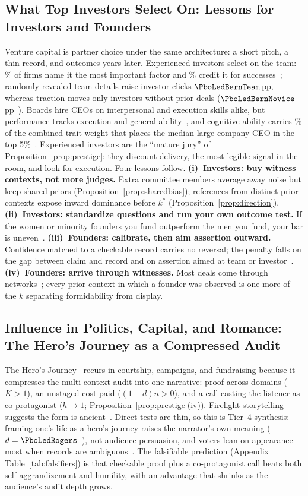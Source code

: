 \subsection{What Top Investors Select On: Lessons for Investors and Founders}
Venture capital is partner choice under the same architecture: a short pitch, a thin record, and outcomes years later. Experienced investors select on the team: \PboLedGompSelect\% of \PboLedGompSelectN{} firms name it the most important factor and \PboLedGompSuccess\% credit it for successes~\cite{gompers2020}; randomly revealed team details raise investor clicks $\PboLedBernTeam$\,pp, whereas traction moves only investors without prior deals ($\PboLedBernNovice$\,pp~\cite{bernstein2017}). Boards hire CEOs on interpersonal and execution skills alike, but performance tracks execution and general ability~\cite{kaplan2012}, and cognitive ability carries \PboLedAdams\% of the combined-trait weight that places the median large-company CEO in the top 5\%~\cite{adams2018}. Experienced investors are the ``mature jury'' of Proposition~\ref{prop:prestige}: they discount delivery, the most legible signal in the room, and look for execution. Four lessons follow. \textbf{(i)~Investors: buy witness contexts, not more judges.} Extra committee members average away noise but keep shared priors (Proposition~\ref{prop:sharedbias}); references from distinct prior contexts expose inward dominance before $k^*$ (Proposition~\ref{prop:direction}). \textbf{(ii)~Investors: standardize questions and run your own outcome test.} If the women or minority founders you fund outperform the men you fund, your bar is uneven~\cite{becker1957,ewens2020}. \textbf{(iii)~Founders: calibrate, then aim assertion outward.} Confidence matched to a checkable record carries no reversal; the penalty falls on the gap between claim and record and on assertion aimed at team or investor~\cite{snyder2008}. \textbf{(iv)~Founders: arrive through witnesses.} Most deals come through networks~\cite{gompers2020}; every prior context in which a founder was observed is one more of the $k$ separating formidability from display.

\subsection{Influence in Politics, Capital, and Romance: The Hero's Journey as a Compressed Audit}
The Hero's Journey~\cite{campbell1949} recurs in courtship, campaigns, and fundraising because it compresses the multi-context audit into one narrative: proof across domains ($K>1$), an unstaged cost paid ($(1-d)n>0$), and a call casting the listener as co-protagonist ($h\to 1$; Proposition~\ref{prop:prestige}(iv)). Firelight storytelling suggests the form is ancient~\cite{wiessner2014}. Direct tests are thin, so this is Tier~4 synthesis: framing one's life as a hero's journey raises the narrator's own meaning ($d=\PboLedRogers$~\cite{rogers2023}), not audience persuasion, and voters lean on appearance most when records are ambiguous~\cite{todorov2005,jacquart2015}. The falsifiable prediction (Appendix Table~\ref{tab:falsifiers}) is that checkable proof plus a co-protagonist call beats both self-aggrandizement and humility, with an advantage that shrinks as the audience's audit depth grows.

